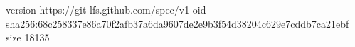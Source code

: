 version https://git-lfs.github.com/spec/v1
oid sha256:68c258337e86a70f2afb37a6da9607de2e9b3f54d38204c629e7cddb7ca21ebf
size 18135
